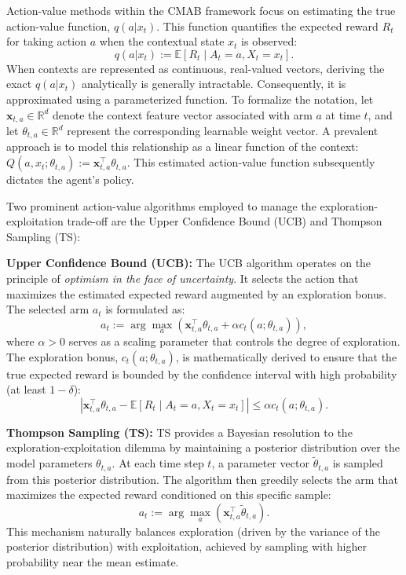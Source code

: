 \documentclass[pdflatex,sn-mathphys-num]{sn-jnl}
\theoremstyle{thmstyleone}%
\theoremstyle{thmstyletwo}%
\theoremstyle{thmstylethree}%
\begin{document}
Action-value methods within the CMAB framework focus on estimating the true action-value function, $q(a|x_t)$. This function quantifies the expected reward $R_t$ for taking action $a$ when the contextual state $x_t$ is observed:
\begin{equation}
q(a|x_t) := \mathbb{E}\left[R_t \mid A_t=a, X_t=x_t\right].
\end{equation}
When contexts are represented as continuous, real-valued vectors, deriving the exact $q(a|x_t)$ analytically is generally intractable. Consequently, it is approximated using a parameterized function. To formalize the notation, let $\mathbf{x}_{t,a} \in \mathbb{R}^d$ denote the context feature vector associated with arm $a$ at time $t$, and let $\theta_{t,a} \in \mathbb{R}^d$ represent the corresponding learnable weight vector. A prevalent approach is to model this relationship as a linear function of the context: $Q(a, x_t; \theta_{t,a}) := \mathbf{x}_{t,a}^\top \theta_{t,a}$. This estimated action-value function subsequently dictates the agent's policy.

Two prominent action-value algorithms employed to manage the exploration-exploitation trade-off are the Upper Confidence Bound (UCB) and Thompson Sampling (TS):

\textbf{Upper Confidence Bound (UCB):} The UCB algorithm \cite{li2010contextual} operates on the principle of \emph{optimism in the face of uncertainty}. It selects the action that maximizes the estimated expected reward augmented by an exploration bonus. The selected arm $a_t$ is formulated as:
\begin{equation}
a_t := \arg\max_a \left( \mathbf{x}_{t,a}^\top \theta_{t,a} + \alpha c_t(a; \theta_{t,a}) \right),
\end{equation}
where $\alpha > 0$ serves as a scaling parameter that controls the degree of exploration. The exploration bonus, $c_t(a; \theta_{t,a})$, is mathematically derived to ensure that the true expected reward is bounded by the confidence interval with high probability (at least $1-\delta$):
\begin{equation}
\left\lvert \mathbf{x}_{t,a}^\top \theta_{t,a} - \mathbb{E}\left[R_t \mid A_t=a, X_t=x_t\right] \right\rvert \leq \alpha c_t(a; \theta_{t,a}).
\end{equation}

\textbf{Thompson Sampling (TS):} TS provides a Bayesian resolution to the exploration-exploitation dilemma by maintaining a posterior distribution over the model parameters $\theta_{t,a}$. At each time step $t$, a parameter vector $\tilde{\theta}_{t,a}$ is sampled from this posterior distribution. The algorithm then greedily selects the arm that maximizes the expected reward conditioned on this specific sample:
\begin{equation}
a_t := \arg\max_a \left( \mathbf{x}_{t,a}^\top \tilde{\theta}_{t,a} \right).
\end{equation}
This mechanism naturally balances exploration (driven by the variance of the posterior distribution) with exploitation, achieved by sampling with higher probability near the mean estimate.
\end{document}
